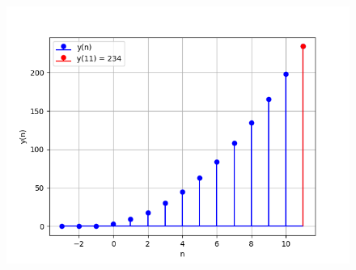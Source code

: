 \documentclass[journal,12pt,twocolumn]{IEEEtran}
\theoremstyle{remark}
\begin{document}
\begin{figure}[htbp]
    \centering
    \includegraphics[width = \columnwidth]{figs/y(n)plot.png}
  \caption{}
    \label{fig:graph1}
\end{figure}

% 
\end{document}
